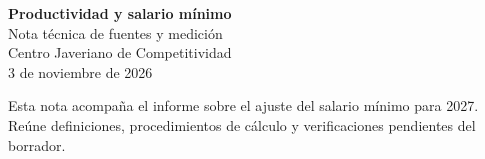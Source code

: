 \documentclass[12pt,a4paper]{article}
\begin{document}
\begin{center}
{\Large\bfseries Productividad y salario mínimo}\\[6pt]
{\large Nota técnica de fuentes y medición}\\[6pt]
Centro Javeriano de Competitividad\\
3 de noviembre de 2026
\end{center}
Esta nota acompaña el informe sobre el ajuste del salario mínimo para 2027. Reúne definiciones, procedimientos de cálculo y verificaciones pendientes del borrador.

\clearpage

\end{document}
